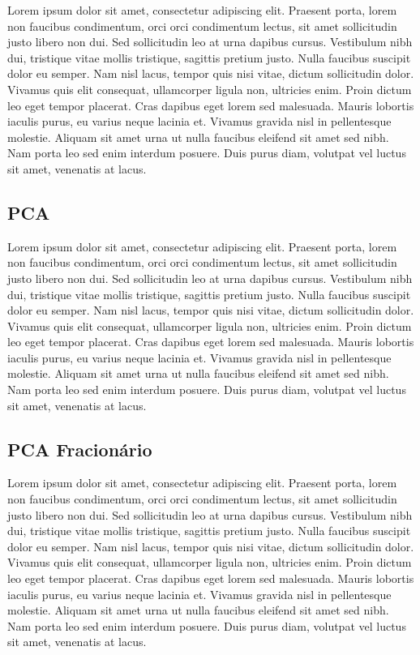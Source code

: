 \documentclass[12pt]{article}
\begin{document}
Lorem ipsum dolor sit amet, consectetur adipiscing elit. Praesent porta, lorem non faucibus condimentum, orci orci condimentum lectus, sit amet sollicitudin justo libero non dui. Sed sollicitudin leo at urna dapibus cursus. Vestibulum nibh dui, tristique vitae mollis tristique, sagittis pretium justo. Nulla faucibus suscipit dolor eu semper. Nam nisl lacus, tempor quis nisi vitae, dictum sollicitudin dolor. Vivamus quis elit consequat, ullamcorper ligula non, ultricies enim. Proin dictum leo eget tempor placerat. Cras dapibus eget lorem sed malesuada. Mauris lobortis iaculis purus, eu varius neque lacinia et. Vivamus gravida nisl in pellentesque molestie. Aliquam sit amet urna ut nulla faucibus eleifend sit amet sed nibh. Nam porta leo sed enim interdum posuere. Duis purus diam, volutpat vel luctus sit amet, venenatis at lacus. 

\subsection{PCA}

Lorem ipsum dolor sit amet, consectetur adipiscing elit. Praesent porta, lorem non faucibus condimentum, orci orci condimentum lectus, sit amet sollicitudin justo libero non dui. Sed sollicitudin leo at urna dapibus cursus. Vestibulum nibh dui, tristique vitae mollis tristique, sagittis pretium justo. Nulla faucibus suscipit dolor eu semper. Nam nisl lacus, tempor quis nisi vitae, dictum sollicitudin dolor. Vivamus quis elit consequat, ullamcorper ligula non, ultricies enim. Proin dictum leo eget tempor placerat. Cras dapibus eget lorem sed malesuada. Mauris lobortis iaculis purus, eu varius neque lacinia et. Vivamus gravida nisl in pellentesque molestie. Aliquam sit amet urna ut nulla faucibus eleifend sit amet sed nibh. Nam porta leo sed enim interdum posuere. Duis purus diam, volutpat vel luctus sit amet, venenatis at lacus. 

\subsection{PCA Fracionário}

Lorem ipsum dolor sit amet, consectetur adipiscing elit. Praesent porta, lorem non faucibus condimentum, orci orci condimentum lectus, sit amet sollicitudin justo libero non dui. Sed sollicitudin leo at urna dapibus cursus. Vestibulum nibh dui, tristique vitae mollis tristique, sagittis pretium justo. Nulla faucibus suscipit dolor eu semper. Nam nisl lacus, tempor quis nisi vitae, dictum sollicitudin dolor. Vivamus quis elit consequat, ullamcorper ligula non, ultricies enim. Proin dictum leo eget tempor placerat. Cras dapibus eget lorem sed malesuada. Mauris lobortis iaculis purus, eu varius neque lacinia et. Vivamus gravida nisl in pellentesque molestie. Aliquam sit amet urna ut nulla faucibus eleifend sit amet sed nibh. Nam porta leo sed enim interdum posuere. Duis purus diam, volutpat vel luctus sit amet, venenatis at lacus. 
\end{document}
